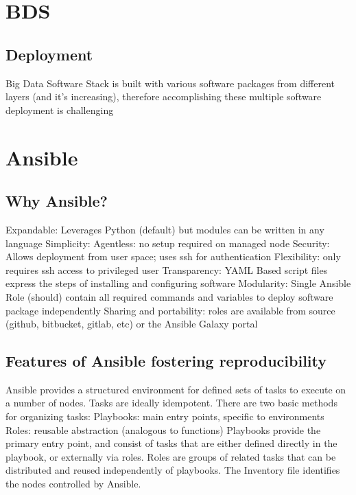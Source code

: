 \section{BDS}

\subsection{Deployment}

Big Data Software Stack is built with various software packages from different layers (and it’s increasing), therefore accomplishing these multiple software deployment is challenging

\section{Ansible}


\subsection{Why Ansible?}
Expandable: Leverages Python (default) but modules can be written in any language
Simplicity: 
Agentless: no setup required on managed node
Security: Allows deployment from user space; uses ssh for authentication
Flexibility: only requires ssh access to privileged user
Transparency: YAML Based script files express the steps of installing and configuring software
Modularity: Single Ansible Role (should) contain all required commands and variables to deploy software package independently
Sharing and portability: roles are available from source (github, bitbucket, gitlab, etc) or the Ansible Galaxy portal


\subsection{Features of Ansible fostering reproducibility}

Ansible provides a structured environment for defined sets of tasks to execute on a number of nodes. Tasks are ideally idempotent.
There are two basic methods for organizing tasks:
Playbooks: main entry points, specific to environments
Roles: reusable abstraction (analogous to functions)
Playbooks provide the primary entry point, and consist of tasks that are either defined directly in the playbook, or externally via roles.
Roles are groups of related tasks that can be distributed and reused independently of playbooks.
The Inventory file identifies the nodes controlled by Ansible.


